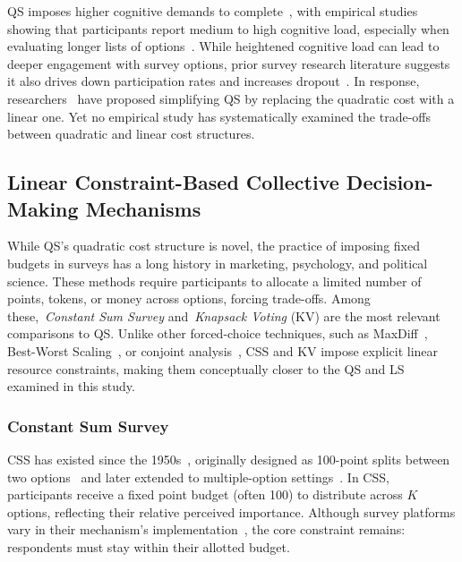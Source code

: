 QS imposes higher cognitive demands to complete~\cite{chengOrganizeThenVote2025}, with empirical studies showing that participants report medium to high cognitive load, especially when evaluating longer lists of options~\cite{cavaille2024cares}. While heightened cognitive load can lead to deeper engagement with survey options, prior survey research literature suggests it also drives down participation rates and increases dropout~\cite{brosnanCognitiveLoadReduction2021, galesicDropoutsWebEffects2006}. In response, researchers~\cite{cavaille2024cares} have proposed simplifying QS by replacing the quadratic cost with a linear one. Yet no empirical study has systematically examined the trade-offs between quadratic and linear cost structures.

\subsection{Linear Constraint-Based Collective Decision-Making Mechanisms}
\label{sec:related_works_force_choice}
While QS's quadratic cost structure is novel, the practice of imposing fixed budgets in surveys has a long history in marketing, psychology, and political science. These methods require participants to allocate a limited number of points, tokens, or money across options, forcing trade-offs. Among these,~\textit{Constant Sum Survey} and~\textit{Knapsack Voting} (KV) are the most relevant comparisons to QS. Unlike other forced-choice techniques, such as MaxDiff~\cite{tsafarakisInvestigatingPreferencesIndividuals2019, schrammIncentiveAlignmentAnchored2024}, Best-Worst Scaling~\cite{louviereBestWorstScalingTheory2015}, or conjoint analysis~\cite{bagozziAdvancedMarketingResearch1994}, CSS and KV impose explicit linear resource constraints, making them conceptually closer to the QS and LS examined in this study.

\subsubsection{Constant Sum Survey}
CSS has existed since the 1950s~\cite{Malhotra_Naresh_K_2012, smithBasicMarketingResearch2013, Donald_R_Cooper2013-03-05}, originally designed as 100-point splits between two options~\cite{metfesselProposalQuantitativeReporting1947} and later extended to multiple-option settings~\cite{zhuSelfestimationWeightParameter1991, harwoodUnderstandingImplicitExplicit2019}. In CSS, participants receive a fixed point budget (often 100) to distribute across $K$ options, reflecting their relative perceived importance. Although survey platforms vary in their mechanism's implementation~\cite{qualtricsConstantSumQuestion2025, surveysparrowWhatConstantSum2025, lorraineConstantSumQuestion2022}, the core constraint remains: respondents must stay within their allotted budget.

